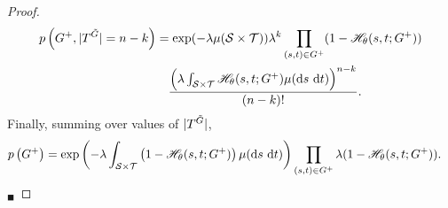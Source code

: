 \documentclass{statsoc}
\begin{document}
\begin{proof}
{%
\begin{align}
  p\left(G^+, |T^{\tilde{G}}|=n-k \right)  &=  \exp(-\lambda \mu(\cS \times \cT))
             \lambda^{k}  \prod_{(s,t) \in G^+} (1- \mathscr{H}_{\theta}(s,t;G^+)) \nonumber \\
          & \quad \frac{\left( \lambda \int_{\cS \times \cT} \mathscr{H}_{\theta}(s,t;G^+)\mu(\dif s\ \dif t) \right)^{n-k}}{(n-k)!}.  %
\end{align}
Finally, summing over values of $|T^{\tilde{G}}|$,}
\begin{align}
 p\left(G^+ \right)  %
           &=   \exp\left(-\lambda  \int_{\cS \times \cT} \left(1 -  \mathscr{H}_{\theta}(s,t;G^+) \right) \mu(\dif s\ \dif t)  \right)
                 \prod_{(s,t) \in G^+} \lambda (1- \mathscr{H_{\theta}}(s,t;G^+)).
\end{align}
${}_\blacksquare$
\end{proof}


\end{document}
